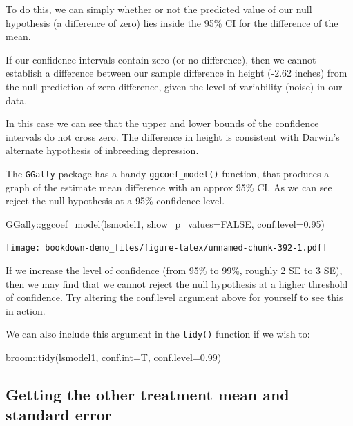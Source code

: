 \documentclass[
]{book}
\newenvironment{Shaded}{\begin{snugshade}}{\end{snugshade}}
\newcommand{\AttributeTok}[1]{\textcolor[rgb]{0.77,0.63,0.00}{#1}}
\newcommand{\ConstantTok}[1]{\textcolor[rgb]{0.00,0.00,0.00}{#1}}
\newcommand{\FloatTok}[1]{\textcolor[rgb]{0.00,0.00,0.81}{#1}}
\newcommand{\FunctionTok}[1]{\textcolor[rgb]{0.00,0.00,0.00}{#1}}
\newcommand{\NormalTok}[1]{#1}
\newcommand{\SpecialCharTok}[1]{\textcolor[rgb]{0.00,0.00,0.00}{#1}}
\begin{document}
To do this, we can simply whether or not the predicted value of our null hypothesis (a difference of zero) lies inside the 95\% CI for the difference of the mean.

If our confidence intervals contain zero (or no difference), then we cannot establish a difference between our sample difference in height (-2.62 inches) from the null prediction of zero difference, given the level of variability (noise) in our data.

In this case we can see that the upper and lower bounds of the confidence intervals do not cross zero. The difference in height is consistent with Darwin's alternate hypothesis of inbreeding depression.

The \texttt{GGally} package has a handy \texttt{ggcoef\_model()} function, that produces a graph of the estimate mean difference with an approx 95\% CI. As we can see reject the null hypothesis at a 95\% confidence level.

\begin{Shaded}
\begin{Highlighting}[]
\NormalTok{GGally}\SpecialCharTok{::}\FunctionTok{ggcoef\_model}\NormalTok{(lsmodel1,}
                     \AttributeTok{show\_p\_values=}\ConstantTok{FALSE}\NormalTok{, }
                     \AttributeTok{conf.level=}\FloatTok{0.95}\NormalTok{)}
\end{Highlighting}
\end{Shaded}

\texttt{[image: bookdown-demo\_files/figure-latex/unnamed-chunk-392-1.pdf]}

If we increase the level of confidence (from 95\% to 99\%, roughly 2 SE to 3 SE), then we may find that we cannot reject the null hypothesis at a higher threshold of confidence. Try altering the conf.level argument above for yourself to see this in action.

We can also include this argument in the \texttt{tidy()} function if we wish to:

\begin{Shaded}
\begin{Highlighting}[]
\NormalTok{broom}\SpecialCharTok{::}\FunctionTok{tidy}\NormalTok{(lsmodel1, }\AttributeTok{conf.int=}\NormalTok{T, }\AttributeTok{conf.level=}\FloatTok{0.99}\NormalTok{)}
\end{Highlighting}
\end{Shaded}

\hypertarget{getting-the-other-treatment-mean-and-standard-error}{%
\subsection{Getting the other treatment mean and standard error}\label{getting-the-other-treatment-mean-and-standard-error}}
\end{document}
